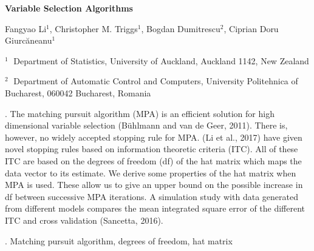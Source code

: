 \documentclass[12pt]{article}
\begin{document}
\begin{flushleft}


{\LARGE\bf Variable Selection Algorithms}


\vspace{1.0cm}

Fangyao Li$^1$, Christopher M. Triggs$^1$,  Bogdan Dumitrescu$^2$, Ciprian Doru Giurc\u{a}neanu$^1$

\begin{description}

\item $^1 \;$ Department of Statistics, University of Auckland, Auckland 1142, New Zealand

\item $^2 \;$ Department of Automatic Control and Computers, University Politehnica of Bucharest, 
 060042 Bucharest, Romania


\end{description}




\end{flushleft}


\vspace{0.75cm}

. The matching pursuit algorithm (MPA) is an efficient solution for high dimensional variable selection (B\"{u}hlmann and van de Geer, 2011). 
There is, however, no widely accepted stopping rule for MPA. (Li et al., 2017) have given novel stopping rules based on information theoretic criteria (ITC). All of 
these ITC are based on the degrees of freedom (df) of the hat matrix which maps the data vector to its estimate. We derive some properties of the hat matrix when MPA 
is used. These allow us to give an upper bound on the possible increase in df between successive MPA iterations. A simulation study with data generated from different
 models compares the mean integrated square error of the different ITC and cross validation (Sancetta, 2016). 

\vskip 2mm

.
Matching pursuit algorithm, degrees of freedom, hat matrix
\end{document}
